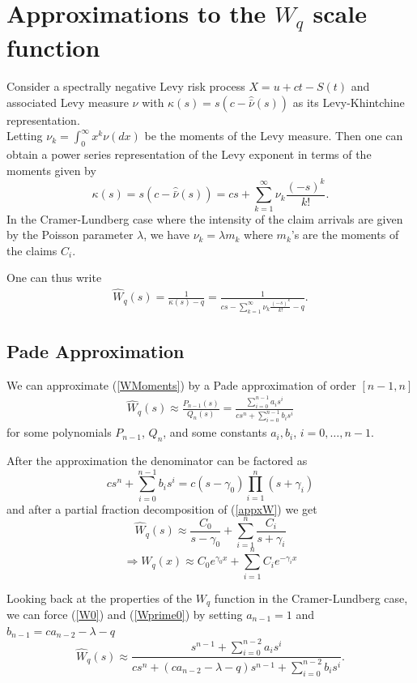 \section{Approximations to the $W_q$ scale function}
Consider a spectrally negative Levy risk process $X = u + ct - S(t)$ and associated Levy measure $\nu$ with $\kappa(s) = s(c- \hat{\bar{\nu}} (s))$ as its Levy-Khintchine representation.\\

Letting $\nu_k = \int_{0}^{\infty} x^k \nu(dx)$ be the moments of the Levy measure. Then one can obtain a power series representation of the Levy exponent in terms of the moments given by
\[
\kappa(s) = s(c- \hat{\bar{\nu}} (s)) = cs + \sum_{k=1}^{\infty} \nu_k \frac{(-s)^k}{k!}.
\]
In the Cramer-Lundberg case where the intensity of the claim arrivals are given by the Poisson parameter $\lambda$, we have $\nu_k = \lambda m_k$ where $m_k$'s are the moments of the claims $C_i$.

One can thus write
\begin{align} \label{WMoments}
\hat{W}_q(s) = \frac{1}{\kappa(s)-q} =  \frac{1}{cs - \sum_{k=1}^{\infty} \nu_k \frac{(-s)^k}{k!} - q}.
\end{align}


\subsection{Pade Approximation}
\label{PadeApproxSection}
We can approximate (\ref{WMoments}) by a Pade approximation of order $[n-1,n]$
\begin{align}
\label{appxW}
\hat{W}_q(s) \approx \frac{P_{n-1}(s)}{Q_{n}(s)} = \frac{\sum_{i=0}^{n-1} a_i s^i}{cs^n + \sum_{i=0}^{n-1} b_i s^i}
\end{align}
for some polynomials $P_{n-1}$, $Q_n$, and some constants $a_i, b_i$, $i=0, \ldots, n-1$.

After the approximation the denominator can be factored as
\[
cs^n + \sum_{i=0}^{n-1} b_i s^i = c(s-\gamma_0) \prod_{i=1}^{n} (s+\gamma_i)
\]
and after a partial fraction decomposition of (\ref{appxW}) we get
\[
\hat{W}_q(s) \approx \frac{C_0}{s-\gamma_0} + \sum_{i=1}^{n} \frac{C_i}{s+\gamma_i}
\]
\[
\Rightarrow W_q(x) \approx C_0 e^{\gamma_0 x} + \sum_{i=1}^{n} C_i e^{-\gamma_i x}
\]

Looking back at the properties of the $W_q$ function in the Cramer-Lundberg case, we can force (\ref{W0}) and (\ref{Wprime0}) by setting $a_{n-1}=1$ and $ b_{n-1} = ca_{n-2} -\lambda - q$
\[
\hat{W}_q(s) \approx \frac{s^{n-1} + \sum_{i=0}^{n-2} a_i s^i}{cs^n + (c a_{n-2} -\lambda - q) s^{n-1} +\sum_{i=0}^{n-2} b_i s^i}.
\]

